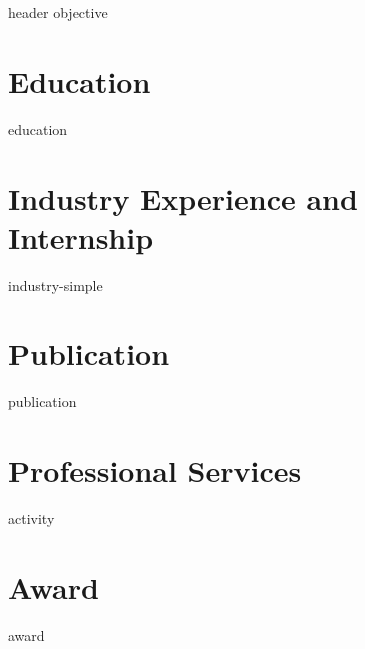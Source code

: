 \documentclass[letter,10pt]{article}
\begin{document}
{header}
{objective}

\section{Education}
{education}

\section{Industry Experience and Internship}
{industry-simple}


\section{Publication}
{publication}



\section{Professional Services}
{activity}

\section{Award}
{award}
\end{document}
